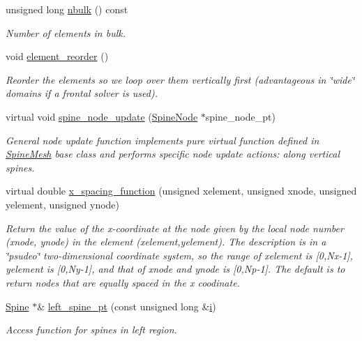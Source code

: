 \begin{DoxyCompactItemize}
unsigned long \hyperlink{classoomph_1_1ChannelSpineMesh_a89f5523009288ce87d2f0d1cbb9fb488}{nbulk} () const
\begin{DoxyCompactList}\small\item\em Number of elements in bulk. \end{DoxyCompactList}\item 
void \hyperlink{classoomph_1_1ChannelSpineMesh_ad449460c4d06b2be64b53097143a3b09}{element\+\_\+reorder} ()
\begin{DoxyCompactList}\small\item\em Reorder the elements so we loop over them vertically first (advantageous in \char`\"{}wide\char`\"{} domains if a frontal solver is used). \end{DoxyCompactList}\item 
virtual void \hyperlink{classoomph_1_1ChannelSpineMesh_aefa38017e44e64ad0cd86d87d397bf8d}{spine\+\_\+node\+\_\+update} (\hyperlink{classoomph_1_1SpineNode}{Spine\+Node} $\ast$spine\+\_\+node\+\_\+pt)
\begin{DoxyCompactList}\small\item\em General node update function implements pure virtual function defined in \hyperlink{classoomph_1_1SpineMesh}{Spine\+Mesh} base class and performs specific node update actions\+: along vertical spines. \end{DoxyCompactList}\item 
virtual double \hyperlink{classoomph_1_1ChannelSpineMesh_a16e0d4264443b1beb274753b0d6b970e}{x\+\_\+spacing\+\_\+function} (unsigned xelement, unsigned xnode, unsigned yelement, unsigned ynode)
\begin{DoxyCompactList}\small\item\em Return the value of the x-\/coordinate at the node given by the local node number (xnode, ynode) in the element (xelement,yelement). The description is in a \char`\"{}psudeo\char`\"{} two-\/dimensional coordinate system, so the range of xelement is \mbox{[}0,Nx-\/1\mbox{]}, yelement is \mbox{[}0,Ny-\/1\mbox{]}, and that of xnode and ynode is \mbox{[}0,Np-\/1\mbox{]}. The default is to return nodes that are equally spaced in the x coodinate. \end{DoxyCompactList}\item 
\hyperlink{classoomph_1_1Spine}{Spine} $\ast$\& \hyperlink{classoomph_1_1ChannelSpineMesh_ad4ae203f8a69fa3c8f0541ede45d7630}{left\+\_\+spine\+\_\+pt} (const unsigned long \&\hyperlink{cfortran_8h_adb50e893b86b3e55e751a42eab3cba82}{i})
\begin{DoxyCompactList}\small\item\em Access function for spines in left region. \end{DoxyCompactList}\item 

\end{DoxyCompactItemize}
